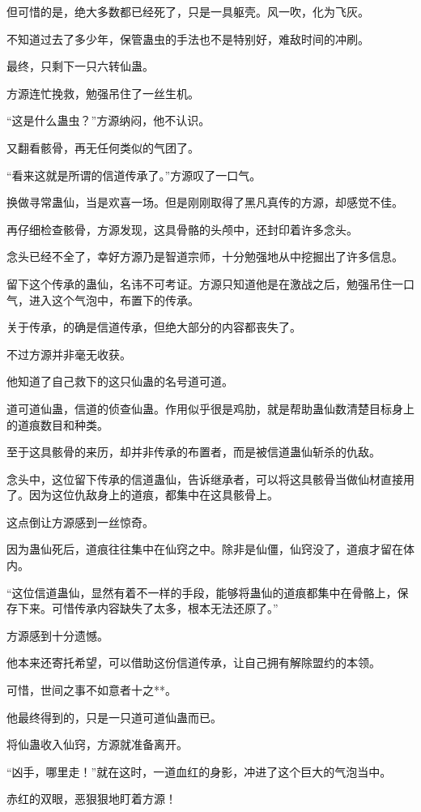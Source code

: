 \begin{this_body}
但可惜的是，绝大多数都已经死了，只是一具躯壳。风一吹，化为飞灰。

不知道过去了多少年，保管蛊虫的手法也不是特别好，难敌时间的冲刷。

最终，只剩下一只六转仙蛊。

方源连忙挽救，勉强吊住了一丝生机。

“这是什么蛊虫？”方源纳闷，他不认识。

又翻看骸骨，再无任何类似的气团了。

“看来这就是所谓的信道传承了。”方源叹了一口气。

换做寻常蛊仙，当是欢喜一场。但是刚刚取得了黑凡真传的方源，却感觉不佳。

再仔细检查骸骨，方源发现，这具骨骼的头颅中，还封印着许多念头。

念头已经不全了，幸好方源乃是智道宗师，十分勉强地从中挖掘出了许多信息。

留下这个传承的蛊仙，名讳不可考证。方源只知道他是在激战之后，勉强吊住一口气，进入这个气泡中，布置下的传承。

关于传承，的确是信道传承，但绝大部分的内容都丧失了。

不过方源并非毫无收获。

他知道了自己救下的这只仙蛊的名号道可道。

道可道仙蛊，信道的侦查仙蛊。作用似乎很是鸡肋，就是帮助蛊仙数清楚目标身上的道痕数目和种类。

至于这具骸骨的来历，却并非传承的布置者，而是被信道蛊仙斩杀的仇敌。

念头中，这位留下传承的信道蛊仙，告诉继承者，可以将这具骸骨当做仙材直接用了。因为这位仇敌身上的道痕，都集中在这具骸骨上。

这点倒让方源感到一丝惊奇。

因为蛊仙死后，道痕往往集中在仙窍之中。除非是仙僵，仙窍没了，道痕才留在体内。

“这位信道蛊仙，显然有着不一样的手段，能够将蛊仙的道痕都集中在骨骼上，保存下来。可惜传承内容缺失了太多，根本无法还原了。”

方源感到十分遗憾。

他本来还寄托希望，可以借助这份信道传承，让自己拥有解除盟约的本领。

可惜，世间之事不如意者十之**。

他最终得到的，只是一只道可道仙蛊而已。

将仙蛊收入仙窍，方源就准备离开。

“凶手，哪里走！”就在这时，一道血红的身影，冲进了这个巨大的气泡当中。

赤红的双眼，恶狠狠地盯着方源！

\end{this_body}

